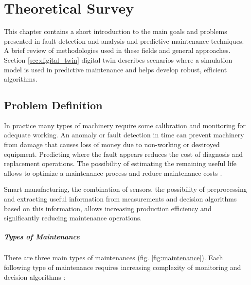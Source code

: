 
\chapter{Theoretical Survey}\label{ch:teor_surv}


This chapter contains a short introduction to the main goals and problems
presented in fault detection and analysis and predictive maintenance
techniques. A brief review of methodologies used in these fields and
general approaches. Section \ref{sec:digital_twin} digital twin describes scenarios where a
simulation model is used in predictive maintenance and helps develop
robust, efficient algorithms.

% 

\section{Problem Definition}


In practice many types of machinery require some calibration and monitoring
for adequate working. An anomaly or fault detection in time can prevent
machinery from damage that causes loss of money due to non-working or
destroyed equipment.  Predicting where the fault appears reduces the cost
of diagnosis and replacement operations. The possibility of estimating the
remaining useful life allows to optimize a maintenance process and reduce
maintenance costs \cite{lit_survey}.


Smart manufacturing, the combination of sensors, the possibility of
preprocessing and extracting useful information from measurements and
decision algorithms based on this information, allows increasing production
efficiency and significantly reducing maintenance operations.


\paragraph{Types of Maintenance} There are three main types of maintenances
(fig. \ref{fig:maintenance}). Each following type of maintenance requires
increasing complexity of monitoring
and decision algorithms \cite{matlab_intro}:

